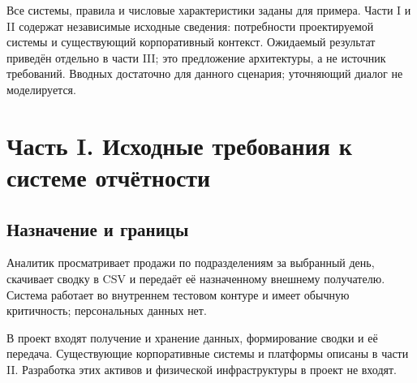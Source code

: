 \documentclass[10pt,a4paper]{article}
\begin{document}
Все системы, правила и числовые характеристики заданы для примера. Части I и II содержат независимые исходные сведения: потребности проектируемой системы и существующий корпоративный контекст. {Ожидаемый результат} приведён отдельно в части III; это предложение архитектуры, а не источник требований. Вводных достаточно для данного сценария; уточняющий диалог не моделируется.

\section{Часть I. Исходные требования к системе отчётности}\label{ux447ux430ux441ux442ux44c-i-ux438ux441ux445ux43eux434ux43dux44bux435-ux442ux440ux435ux431ux43eux432ux430ux43dux438ux44f-ux43a-ux441ux438ux441ux442ux435ux43cux435-ux43eux442ux447ux451ux442ux43dux43eux441ux442ux438}

\subsection{Назначение и границы}\label{ux43dux430ux437ux43dux430ux447ux435ux43dux438ux435-ux438-ux433ux440ux430ux43dux438ux446ux44b}

Аналитик просматривает продажи по подразделениям за выбранный день, скачивает сводку в CSV и передаёт её назначенному внешнему получателю. Система работает во внутреннем тестовом контуре и имеет обычную критичность; персональных данных нет.

В проект входят получение и хранение данных, формирование сводки и её передача. Существующие корпоративные системы и платформы описаны в части II. Разработка этих активов и физической инфраструктуры в проект не входят.

\end{document}
